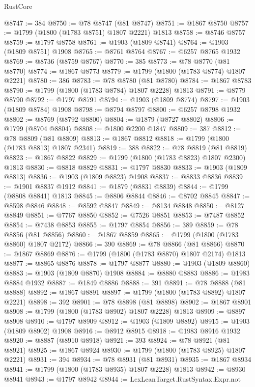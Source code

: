 \begin{lexlean}{RustCore}
\begin{coremodule}
@8747 := 384
@8750 := @78 @8747 (@81 @8747)
@8751 := @1867 @8750
@8757 := @1799 (@1800 (@1783 @8751) @1807 @2221) @1813
@8758 := @8746 @8757
@8759 := @1797 @8758
@8761 := @1903 (@1809 @8741)
@8764 := @1903 (@1809 @8751) @1908
@8765 := @8761 @8764
@8767 := @6257 @8765 @1932
@8769 := @8736 (@8759 @8767)
@8770 := 385
@8773 := @78 @8770 (@81 @8770)
@8774 := @1867 @8773
@8779 := @1799 (@1800 (@1783 @8774) @1807 @2221)
@8780 := 386
@8783 := @78 @8780 (@81 @8780)
@8784 := @1867 @8783
@8790 := @1799 (@1800 (@1783 @8784) @1807 @2228) @1813
@8791 := @8779 @8790
@8792 := @1797 @8791
@8794 := @1903 (@1809 @8774)
@8797 := @1903 (@1809 @8784) @1908
@8798 := @8794 @8797
@8800 := @6257 @8798 @1932
@8802 := @8769 (@8792 @8800)
@8804 := @1879 (@8727 @8802)
@8806 := @1799 (@8704 @8804)
@8808 := @1800 @2200 @1847
@8809 := 387
@8812 := @78 @8809 (@81 @8809)
@8813 := @1867 @8812
@8818 := @1799 (@1800 (@1783 @8813) @1807 @2341)
@8819 := 388
@8822 := @78 @8819 (@81 @8819)
@8823 := @1867 @8822
@8829 := @1799 (@1800 (@1783 @8823) @1807 @2300) @1813
@8830 := @8818 @8829
@8831 := @1797 @8830
@8833 := @1903 (@1809 @8813)
@8836 := @1903 (@1809 @8823) @1908
@8837 := @8833 @8836
@8839 := @1901 @8837 @1912
@8841 := @1879 (@8831 @8839)
@8844 := @1799 (@8808 @8841) @1813
@8845 := @8806 @8844
@8846 := @8702 @8845
@8847 := @8598 @8846
@8848 := @8592 @8847
@8849 := @8134 @8848
@8850 := @8127 @8849
@8851 := @7767 @8850
@8852 := @7526 @8851
@8853 := @7487 @8852
@8854 := @7438 @8853
@8855 := @1797 @8854
@8856 := 389
@8859 := @78 @8856 (@81 @8856)
@8860 := @1867 @8859
@8865 := @1799 (@1800 (@1783 @8860) @1807 @2172)
@8866 := 390
@8869 := @78 @8866 (@81 @8866)
@8870 := @1867 @8869
@8876 := @1799 (@1800 (@1783 @8870) @1807 @2174) @1813
@8877 := @8865 @8876
@8878 := @1797 @8877
@8880 := @1903 (@1809 @8860)
@8883 := @1903 (@1809 @8870) @1908
@8884 := @8880 @8883
@8886 := @1983 @8884 @1932
@8887 := @1849 @8886
@8888 := 391
@8891 := @78 @8888 (@81 @8888)
@8892 := @1867 @8891
@8897 := @1799 (@1800 (@1783 @8892) @1807 @2221)
@8898 := 392
@8901 := @78 @8898 (@81 @8898)
@8902 := @1867 @8901
@8908 := @1799 (@1800 (@1783 @8902) @1807 @2228) @1813
@8909 := @8897 @8908
@8910 := @1797 @8909
@8912 := @1903 (@1809 @8892)
@8915 := @1903 (@1809 @8902) @1908
@8916 := @8912 @8915
@8918 := @1983 @8916 @1932
@8920 := @8887 (@8910 @8918)
@8921 := 393
@8924 := @78 @8921 (@81 @8921)
@8925 := @1867 @8924
@8930 := @1799 (@1800 (@1783 @8925) @1807 @2221)
@8931 := 394
@8934 := @78 @8931 (@81 @8931)
@8935 := @1867 @8934
@8941 := @1799 (@1800 (@1783 @8935) @1807 @2228) @1813
@8942 := @8930 @8941
@8943 := @1797 @8942
@8944 := LexLeanTarget.RustSyntax.Expr.not

\end{coremodule}
\end{lexlean}
